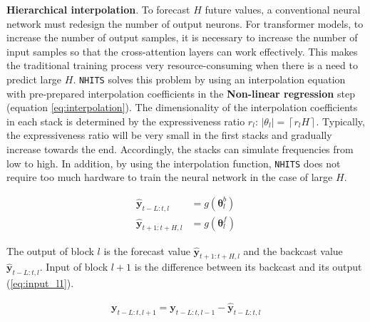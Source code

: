 \textbf{Hierarchical interpolation}. To forecast $H$ future values, a conventional neural network must redesign the number of output neurons. For transformer models, to increase the number of output samples, it is necessary to increase the number of input samples so that the cross-attention layers can work effectively. This makes the traditional training process very resource-consuming when there is a need to predict large $H$. \verb|NHITS| solves this problem by using an interpolation equation with pre-prepared interpolation coefficients in the \textbf{Non-linear regression} step (equation \ref{eq:interpolation}). The dimensionality of the interpolation coefficients in each stack is determined by the expressiveness ratio $r_l$: $\left| \theta_l \right| = \left \lceil r_l H \right \rceil$. Typically, the expressiveness ratio will be very small in the first stacks and gradually increase towards the end. Accordingly, the stacks can simulate frequencies from low to high. In addition, by using the interpolation function, \verb|NHITS| does not require too much hardware to train the neural network in the case of large $H$.

\begin{align}
    \mathbf{\hat{y}}_{t-L:t, l} &= g\left(\mathbf{\theta}_l^b\right)\\
    \mathbf{\hat{y}}_{t+1:t+H, l} &= g\left(\mathbf{\theta}_l^f\right)
    \label{eq:interpolation}
\end{align}


The output of block $l$ is the forecast value $\mathbf{\hat{y}}_{t+1:t+H, l}$ and the backcast value $\mathbf{\hat{y}}_{ t-L:t, l}$. Input of block $l+1$ is the difference between its backcast and its output (\ref{eq:input_l1}).

\begin{align}
    \mathbf{y}_{t-L:t, l+1} = \mathbf{y}_{t-L:t, l-1} - \mathbf{\hat{y}}_{t-L:t, l}
    \label{eq:input_l1}
\end{align}


